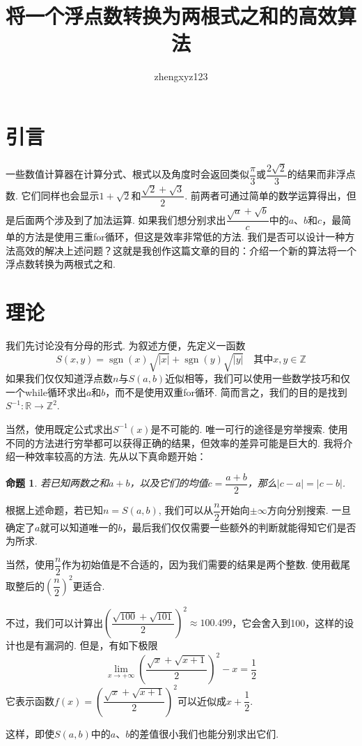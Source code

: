 \documentclass[a4paper, UTF8]{ctexart}
\title{将一个浮点数转换为两根式之和的高效算法}
\author{zhengxyz123}
\newtheorem{proposition}{命题}
\DeclareMathOperator{\sgn}{\mathrm{sgn}}
\begin{document}
\maketitle

\section{引言}
一些数值计算器在计算分式、根式以及角度时会返回类似$\dfrac{\pi}{3}$或$\dfrac{2\sqrt{2}}{3}$的结果而非浮点数. 它们同样也会显示$1+\sqrt{2}$和$\dfrac{\sqrt{2}+\sqrt{3}}{2}$. 前两者可通过简单的数学运算得出，但是后面两个涉及到了加法运算. 如果我们想分别求出$\dfrac{\sqrt{a}+\sqrt{b}}{c}$中的$a$、$b$和$c$，最简单的方法是使用三重for循环，但这是效率非常低的方法. 我们是否可以设计一种方法高效的解决上述问题？这就是我创作这篇文章的目的：介绍一个新的算法将一个浮点数转换为两根式之和.

\section{理论}
我们先讨论没有分母的形式. 为叙述方便，先定义一函数\[S(x,y)=\sgn(x)\sqrt{|x|}+\sgn(y)\sqrt{|y|} \quad\mbox{其中}x,y\in\mathbb{Z}\]如果我们仅仅知道浮点数$n$与$S(a,b)$近似相等，我们可以使用一些数学技巧和仅一个while循环求出$a$和$b$，而不是使用双重for循环. 简而言之，我们的目的是找到$S^{-1}:\mathbb{R}\to\mathbb{Z}^2$.

当然，使用既定公式求出$S^{-1}(x)$是不可能的. 唯一可行的途径是穷举搜索. 使用不同的方法进行穷举都可以获得正确的结果，但效率的差异可能是巨大的. 我将介绍一种效率较高的方法. 先从以下真命题开始：
\begin{proposition}
    若已知两数之和$a+b$，以及它们的均值$c=\dfrac{a+b}{2}$，那么$|c-a|=|c-b|$. 
\end{proposition}
根据上述命题，若已知$n=S(a,b)$, 我们可以从$\dfrac{n}{2}$开始向$\pm\infty$方向分别搜索. 一旦确定了$a$就可以知道唯一的$b$，最后我们仅仅需要一些额外的判断就能得知它们是否为所求.

当然，使用$\dfrac{n}{2}$作为初始值是不合适的，因为我们需要的结果是两个整数. 使用截尾取整后的$\left(\dfrac{n}{2}\right)^2$更适合.

不过，我们可以计算出$\left(\dfrac{\sqrt{100}+\sqrt{101}}{2}\right)^2\approx100.499$，它会舍入到100，这样的设计也是有漏洞的. 但是，有如下极限\[\lim_{x\to+\infty}\left(\frac{\sqrt{x}+\sqrt{x+1}}{2}\right)^2-x=\frac{1}{2}\]它表示函数$f(x)=\left(\dfrac{\sqrt{x}+\sqrt{x+1}}{2}\right)^2$可以近似成$x+\dfrac{1}{2}$.

这样，即使$S(a,b)$中的$a$、$b$的差值很小我们也能分别求出它们.
\end{document}
